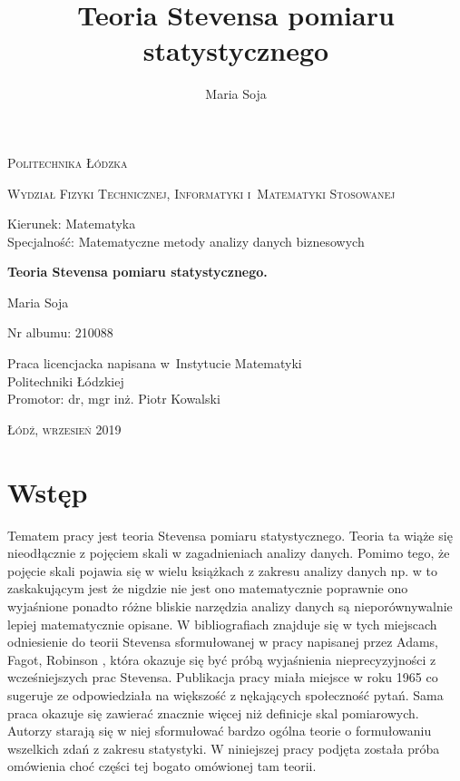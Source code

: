 \documentclass[12pt,a4paper]{report}
\author{Maria Soja}
\title{Teoria Stevensa pomiaru statystycznego}
\begin{document}
\begin{titlepage}
\begin{flushleft}
\end{flushleft}
\begin{center}
\textsc{{\huge Politechnika Łódzka}}
\end{center}
\bigskip
\bigskip
\begin{center}
\textsc{{\Large Wydział Fizyki Technicznej, Informatyki i~Matematyki Stosowanej}}
\end{center}
\bigskip
\bigskip
\begin{Large}
Kierunek: Matematyka 
\\Specjalność: Matematyczne metody analizy danych biznesowych

\end{Large}
\bigskip
\bigskip
\noindent\hrulefill
\begin{center}
{\textbf{{\Large Teoria Stevensa pomiaru statystycznego.}}}
\end{center}
\begin{flushright}
{\large 
Maria Soja

Nr albumu: 
210088
}
\end{flushright}
\noindent\hrulefill
\bigskip
\bigskip
\begin{center}
{\large Praca licencjacka
napisana w~Instytucie Matematyki 
\\Politechniki Łódzkiej 
\bigskip
\bigskip
\\Promotor: dr, mgr inż. Piotr Kowalski
 }
\end{center}
\bigskip
\bigskip
\bigskip
\bigskip
\begin{center}
{\textsc{\large Łódź, wrzesień 2019}}
\end{center}
\end{titlepage}


\tableofcontents

\chapter{Wstęp}

Tematem pracy jest teoria Stevensa pomiaru statystycznego. Teoria ta wiąże się nieodłącznie z pojęciem skali w zagadnieniach analizy danych. Pomimo tego, że pojęcie skali pojawia się w wielu książkach z zakresu analizy danych np. w {\citep{walesiak2009statystyczna}} to zaskakującym jest że nigdzie nie jest ono matematycznie poprawnie ono wyjaśnione ponadto różne bliskie narzędzia analizy danych są nieporównywalnie lepiej matematycznie opisane. W bibliografiach znajduje się w tych miejscach odniesienie do teorii Stevensa sformułowanej w pracy napisanej przez Adams, Fagot, Robinson {\citep{adams1965theory}}, która okazuje się być próbą wyjaśnienia nieprecyzyjności z wcześniejszych prac Stevensa. Publikacja pracy miała miejsce w roku 1965 co sugeruje ze odpowiedziała na większość z nękających społeczność pytań. Sama praca okazuje się zawierać znacznie więcej niż definicje skal pomiarowych. Autorzy starają się w niej sformułować bardzo ogólna teorie o formułowaniu wszelkich zdań z zakresu statystyki. W niniejszej pracy podjęta została próba omówienia choć części tej bogato omówionej tam teorii. 
 
\end{document}

